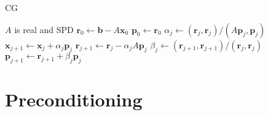 \begin{algorithm}
	\caption{CG}\label{alg:cg}
	\begin{algorithmic}[1]
        \Require $A$ is real and SPD
            \State $\mathbf{r}_0 \gets \mathbf{b} - A\mathbf{x}_0$
            \State $\mathbf{p}_0 \gets \mathbf{r}_0$
                \State $\alpha_j \gets \left(\mathbf{r}_j, \mathbf{r}_j\right)/\left(A\mathbf{p}_j, \mathbf{p}_j\right)$
                \State $\mathbf{x}_{j+1} \gets \mathbf{x}_j + \alpha_j \mathbf{p}_j$
                \State $\mathbf{r}_{j+1} \gets \mathbf{r}_j - \alpha_j A \mathbf{p}_j$
                \State $\beta_j \gets \left(\mathbf{r}_{j+1}, \mathbf{r}_{j+1}\right)/\left(\mathbf{r}_j, \mathbf{r}_j\right)$
                \State $\mathbf{p}_{j+1} \gets \mathbf{r}_{j+1} + \beta_j \mathbf{p}_j$
            \EndFor
        \EndProcedure
    \end{algorithmic}
\end{algorithm}




\section{Preconditioning}

